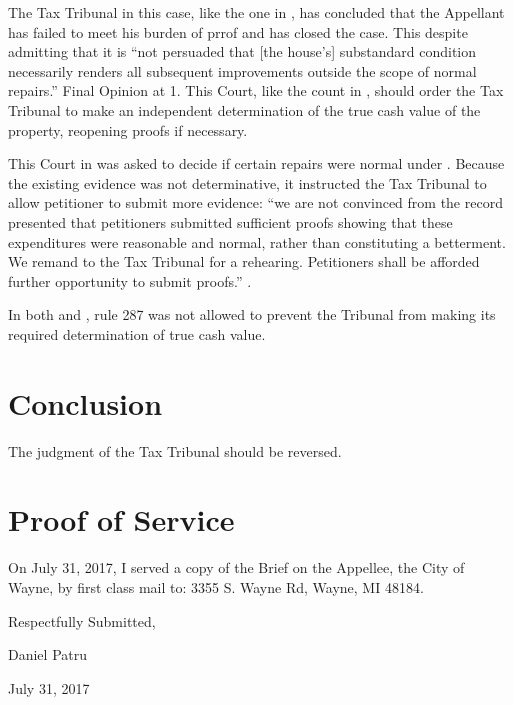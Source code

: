 \documentclass[12pt,\documentclassflag]{michiganCourtOfAppealsBrief}
\def\mathieuGast{\pincite[l]{MCL}{211.27(2)}}
\begin{document}
The Tax Tribunal in this case, like the one in \cite[s]{Jones & Laughlin}, has concluded that the Appellant has failed to meet his burden of prrof and has closed the case.  This despite admitting that it is ``not persuaded that [the house's] substandard condition necessarily renders all subsequent improvements outside the scope of normal repairs.'' Final Opinion at 1. This Court, like the count in \cite[s]{Jones & Laughlin}, should order the Tax Tribunal to make an independent determination of the true cash value of the property, reopening proofs if necessary.

This Court in \cite{Fisher} was asked to decide if certain repairs were normal under \mathieuGast. Because the existing evidence was not determinative, it instructed the Tax Tribunal to allow petitioner to submit more evidence: ``we are not convinced from the record presented that petitioners submitted sufficient proofs showing that these expenditures were reasonable and normal, rather than constituting a betterment. We remand to the Tax Tribunal for a rehearing. Petitioners shall be afforded further opportunity to submit proofs.'' .

In both \cite[s]{Jones & Laughlin} and \cite[s]{Fisher}, rule 287 was not allowed to prevent the Tribunal from making its required determination of true cash value.

 
\section{Conclusion}

The judgment of the Tax Tribunal should be reversed. 
 

\section{Proof of Service}

On July 31, 2017, I served a copy of the Brief on the Appellee, the City of Wayne, by first class mail to: 3355 S. Wayne Rd, Wayne, MI 48184. 


\vspace{1\baselineskip}

{ \setlength{\leftskip}{3.5in}

  Respectfully Submitted,

  Daniel Patru

  July 31, 2017

  \setlength{\leftskip}{0pt}}
\end{document}
